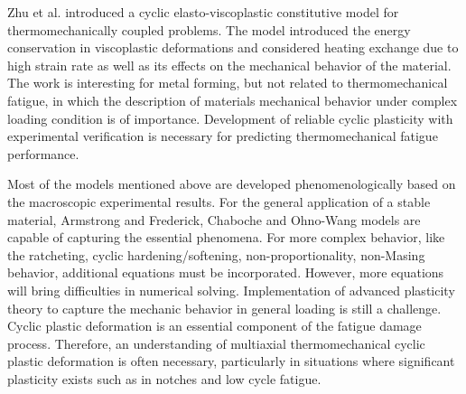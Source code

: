 Zhu et al. \cite{ZHU2016} introduced a cyclic elasto-viscoplastic constitutive model for thermomechanically coupled problems. The model introduced the energy conservation in viscoplastic deformations and considered heating exchange due to high strain rate as well as its effects on the mechanical behavior of the material. The work is interesting for metal forming, but not related to thermomechanical fatigue, in which the description of materials mechanical behavior under complex loading condition is of importance. 
Development of reliable cyclic plasticity with experimental verification is necessary for predicting thermomechanical fatigue performance.



Most of the models mentioned above are developed phenomenologically based on the macroscopic experimental results.
For the general application of a stable material, Armstrong and Frederick, Chaboche and Ohno-Wang models are capable of capturing the essential phenomena.
For more complex behavior, like the ratcheting, cyclic hardening/softening, non-proportionality, non-Masing behavior, additional equations must be incorporated.
However, more equations will bring difficulties in numerical solving.
Implementation of advanced plasticity theory to capture the mechanic behavior in general loading is still a challenge.
Cyclic plastic deformation is an essential component of the fatigue damage process.
Therefore, an understanding of multiaxial thermomechanical cyclic plastic deformation is often necessary, particularly in situations where significant plasticity exists such as in notches and low cycle fatigue.

